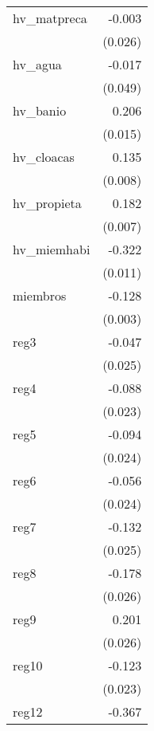 {\begin{longtable}{l*{1}{D{.}{.}{-1}}}
\addlinespace
hv\_matpreca &      -0.003         \\
            &     (0.026)         \\
\addlinespace
hv\_agua     &      -0.017         \\
            &     (0.049)         \\
\addlinespace
hv\_banio    &       0.206\sym{***}\\
            &     (0.015)         \\
\addlinespace
hv\_cloacas  &       0.135\sym{***}\\
            &     (0.008)         \\
\addlinespace
hv\_propieta &       0.182\sym{***}\\
            &     (0.007)         \\
\addlinespace
hv\_miemhabi &      -0.322\sym{***}\\
            &     (0.011)         \\
\addlinespace
miembros    &      -0.128\sym{***}\\
            &     (0.003)         \\
\addlinespace
reg3        &      -0.047         \\
            &     (0.025)         \\
\addlinespace
reg4        &      -0.088\sym{***}\\
            &     (0.023)         \\
\addlinespace
reg5        &      -0.094\sym{***}\\
            &     (0.024)         \\
\addlinespace
reg6        &      -0.056\sym{*}  \\
            &     (0.024)         \\
\addlinespace
reg7        &      -0.132\sym{***}\\
            &     (0.025)         \\
\addlinespace
reg8        &      -0.178\sym{***}\\
            &     (0.026)         \\
\addlinespace
reg9        &       0.201\sym{***}\\
            &     (0.026)         \\
\addlinespace
reg10       &      -0.123\sym{***}\\
            &     (0.023)         \\
\addlinespace
reg12       &      -0.367\sym{***}\\

\end{longtable}}
